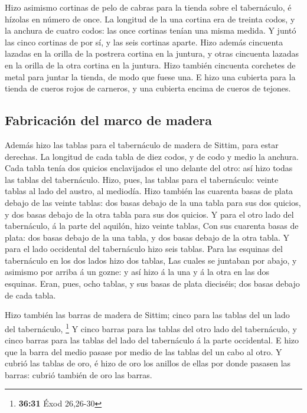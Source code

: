  Hizo asimismo cortinas de pelo de cabras para la tienda
sobre el tabernáculo, é hízolas en número de once.  La
longitud de la una cortina era de treinta codos, y la anchura de cuatro
codos: las once cortinas tenían una misma medida.  Y juntó
las cinco cortinas de por sí, y las seis cortinas aparte. 
Hizo además cincuenta lazadas en la orilla de la postrera cortina en la
juntura, y otras cincuenta lazadas en la orilla de la otra cortina en la
juntura.  Hizo también cincuenta corchetes de metal para
juntar la tienda, de modo que fuese una.  E hizo una
cubierta para la tienda de cueros rojos de carneros, y una cubierta
encima de cueros de tejones.

\hypertarget{fabricaciuxf3n-del-marco-de-madera}{%
\subsection{Fabricación del marco de
madera}\label{fabricaciuxf3n-del-marco-de-madera}}

 Además hizo las tablas para el tabernáculo de madera de
Sittim, para estar derechas.  La longitud de cada tabla de
diez codos, y de codo y medio la anchura.  Cada tabla tenía
dos quicios enclavijados el uno delante del otro: así hizo todas las
tablas del tabernáculo.  Hizo, pues, las tablas para el
tabernáculo: veinte tablas al lado del austro, al mediodía.
 Hizo también las cuarenta basas de plata debajo de las
veinte tablas: dos basas debajo de la una tabla para sus dos quicios, y
dos basas debajo de la otra tabla para sus dos quicios.  Y
para el otro lado del tabernáculo, á la parte del aquilón, hizo veinte
tablas,  Con sus cuarenta basas de plata: dos basas debajo
de la una tabla, y dos basas debajo de la otra tabla.  Y
para el lado occidental del tabernáculo hizo seis tablas. 
Para las esquinas del tabernáculo en los dos lados hizo dos tablas,
 Las cuales se juntaban por abajo, y asimismo por arriba á
un gozne: y así hizo á la una y á la otra en las dos esquinas.
 Eran, pues, ocho tablas, y sus basas de plata dieciséis;
dos basas debajo de cada tabla.

 Hizo también las barras de madera de Sittim; cinco para
las tablas del un lado del tabernáculo, \footnote{\textbf{36:31} Éxod
  26,26-30}  Y cinco barras para las tablas del otro lado
del tabernáculo, y cinco barras para las tablas del lado del tabernáculo
á la parte occidental.  E hizo que la barra del medio
pasase por medio de las tablas del un cabo al otro.  Y
cubrió las tablas de oro, é hizo de oro los anillos de ellas por donde
pasasen las barras: cubrió también de oro las barras.

